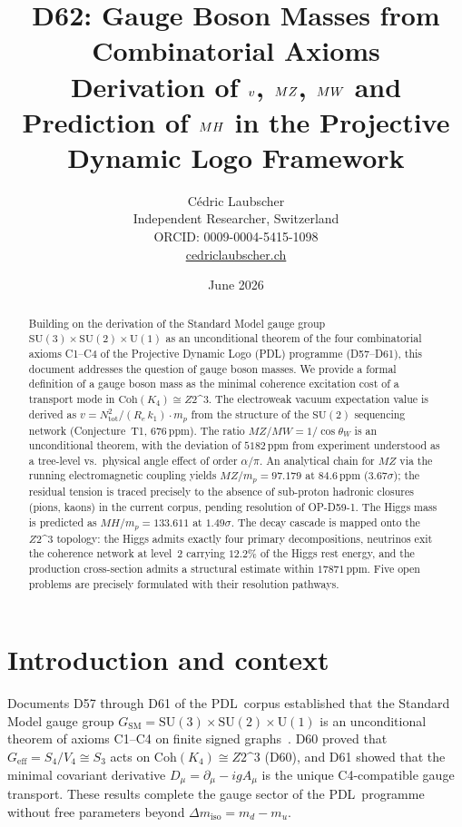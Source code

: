 \documentclass[12pt,a4paper]{article}
\title{%
  \textbf{D62: Gauge Boson Masses from Combinatorial Axioms}\\[0.4em]
  \large Derivation of \texorpdfstring{$\vev$, $\MZ$, $\MW$}{v, MZ, MW}
  and Prediction of \texorpdfstring{$\MH$}{MH}
  in the Projective Dynamic Logo Framework
}
\author{C\'edric Laubscher\\[0.3em]
  \small Independent Researcher, Switzerland\\
  \small ORCID: 0009-0004-5415-1098\\
  \small \href{https://cedriclaubscher.ch}{cedriclaubscher.ch}
}
\date{June 2026}
\theoremstyle{remark}
\newcommand{\PDL}{\textsc{pdl}}
\newcommand{\Coh}{\mathrm{Coh}}
\newcommand{\Ztwo}{\mathbb{Z}_{2}^{3}}
\newcommand{\miso}{\Delta m_{\mathrm{iso}}}
\newcommand{\Ntot}{N_{\mathrm{tot}}}
\newcommand{\cosW}{\cos\theta_{W}}
\newcommand{\MZ}{M_{Z}}
\newcommand{\MW}{M_{W}}
\newcommand{\MH}{M_{H}}
\newcommand{\vev}{v}
\newcommand{\ppm}{\,\mathrm{ppm}}
\newcommand{\mproton}{m_{p}}
\def\PDL{PDL}%
\def\Ztwo{Z2\^{}3}%
\def\MZ{MZ}%
\def\MW{MW}%
\def\MH{MH}%
\begin{document}
\maketitle

\begin{abstract}
Building on the derivation of the Standard Model gauge group
$\mathrm{SU}(3)\times\mathrm{SU}(2)\times\mathrm{U}(1)$ as an unconditional
theorem of the four combinatorial axioms C1--C4 of the Projective Dynamic Logo
(\PDL) programme (D57--D61), this document addresses the question of gauge
boson masses. We provide a formal definition of a gauge boson mass as the
minimal coherence excitation cost of a transport mode in
$\Coh(K_4)\cong\Ztwo$. The electroweak vacuum expectation value is derived as
$\vev = \Ntot^{2}/(R_{e}\,k_{1})\cdot\mproton$ from the structure of the
$\mathrm{SU}(2)$ sequencing network (Conjecture~T1, $676\ppm$). The ratio
$\MZ/\MW = 1/\cosW$ is an unconditional theorem, with the deviation of
$5182\ppm$ from experiment understood as a tree-level vs.\ physical angle
effect of order $\alpha/\pi$. An analytical chain for $\MZ$ via the running
electromagnetic coupling yields $\MZ/\mproton = 97.179$ at $84.6\ppm$
($3.67\sigma$); the residual tension is traced precisely to the absence of
sub-proton hadronic closures (pions, kaons) in the current corpus, pending
resolution of OP-D59-1. The Higgs mass is predicted as
$\MH/\mproton = 133.611$ at $1.49\sigma$. The decay cascade is mapped onto
the $\Ztwo$ topology: the Higgs admits exactly four primary decompositions,
neutrinos exit the coherence network at level~2 carrying $12.2\%$ of the
Higgs rest energy, and the production cross-section admits a structural
estimate within $17871\ppm$. Five open problems are precisely formulated with
their resolution pathways.
\end{abstract}

\clearpage

\tableofcontents
\newpage

\section{Introduction and context}

Documents D57 through D61 of the \PDL\ corpus established that the Standard
Model gauge group $G_{\mathrm{SM}}=\mathrm{SU}(3)\times\mathrm{SU}(2)\times
\mathrm{U}(1)$ is an unconditional theorem of axioms C1--C4 on finite signed
graphs~\cite{D57,D58,D59,D60,D61}. D60 proved that $G_{\mathrm{eff}}=
S_{4}/V_{4}\cong S_{3}$ acts on $\Coh(K_4)\cong\Ztwo$ (D60), and D61
showed that the minimal covariant derivative $D_{\mu}=\partial_{\mu}-igA_{\mu}$
is the unique C4-compatible gauge transport. These results complete the gauge
sector of the \PDL\ programme without free parameters beyond $\miso=m_{d}-m_{u}$.
\end{document}
